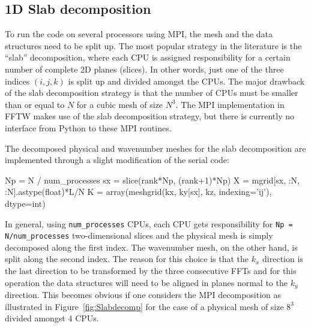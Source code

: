 \documentclass[final,3p,times,twocolumn]{elsarticle}
\newcommand{\inpyth}{\lstinline[style=inlinestyle]} %[]%
\begin{document}
\subsection{1D Slab decomposition}
\label{slab1D}

To run the code on several processors using MPI, the mesh and the data 
structures need to be split up. The most popular strategy in the literature is 
the ``slab'' decomposition, where each CPU is assigned responsibility for a 
certain number of complete 2D planes (slices). In other words, just one of the 
three indices $(i,j,k)$ is split up and divided amongst the CPUs. The major 
drawback of the slab decomposition strategy is that the number of CPUs must be 
smaller than or equal to $N$ for a cubic mesh of size $N^3$. The MPI 
implementation in FFTW makes use of the slab decomposition strategy, but there 
is currently no interface from Python to these MPI routines.

The decomposed physical and wavenumber meshes for the slab decomposition are implemented through a slight modification of the serial code:

\begin{python}
Np = N / num_processes
sx = slice(rank*Np, (rank+1)*Np)
X = mgrid[sx, :N, :N].astype(float)*L/N
K = array(meshgrid(kx, ky[sx], kz,
          indexing='ij'), dtype=int)
\end{python}
In general, using \inpyth{num_processes} CPUs, each CPU gets responsibility for \inpyth{Np = N/num_processes} two-dimensional slices and the physical mesh is simply decomposed along the first index. The wavenumber mesh, on the other hand, is split along the second index. The reason for this choice is that the $k_x$ direction is the last direction to be transformed by the three consecutive FFTs and for this operation the data structures will need to be aligned in planes normal to the $k_y$ direction. This becomes obvious if one considers the MPI decomposition as illustrated in Figure~\ref{fig:Slabdecomp} for the case of a physical mesh of size $8^3$ divided amongst 4 CPUs.
\end{document}
